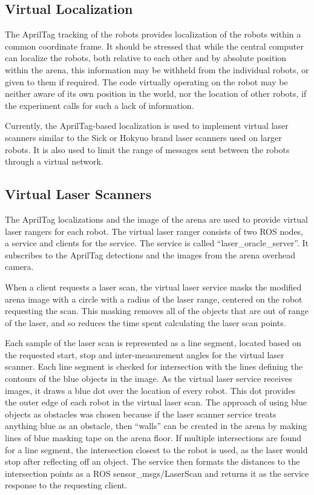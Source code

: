 \subsection{Virtual Localization}

The AprilTag tracking of the robots provides localization of the robots within a common coordinate frame. 
It should be stressed that while the central computer can localize the robots, both relative to each other and by absolute position within the arena, this information may be withheld from the individual robots, or given to them if required. 
The code virtually operating on the robot may be neither aware of its own position in the world, nor the location of other robots, if the experiment calls for such a lack of information. 

Currently, the AprilTag-based localization is used to implement virtual laser scanners similar to the Sick or Hokyuo brand laser scanners used on larger robots. 
It is also used to limit the range of messages sent between the robots through a virtual network. 

\subsection{Virtual Laser Scanners}

The AprilTag localizations and the image of the arena are used to provide virtual laser rangers for each robot. 
The virtual laser ranger consists of two ROS nodes, a service and clients for the service. 
The service is called ``laser\_oracle\_server''. 
It subscribes to the AprilTag detections and the images from the arena overhead camera. 
 
When a client requests a laser scan, the virtual laser service masks the modified arena image with a circle with a radius of the laser range, centered on the robot requesting the scan.
This masking removes all of the objects that are out of range of the laser, and so reduces the time spent calculating the laser scan points. 

Each sample of the laser scan is represented as a line segment, located based on the requested start, stop and inter-measurement angles for the virtual laser scanner. 
Each line segment is checked for intersection with the lines defining the contours of the blue objects in the image. 
As the virtual laser service receives images, it draws a blue dot over the location of every robot. 
This dot provides the outer edge of each robot in the virtual laser scan. 
The approach of using blue objects as obstacles was chosen because if the laser scanner service treats anything blue as an obstacle, then ``walls'' can be created in the arena by making lines of blue masking tape on the arena floor. 
If multiple intersections are found for a line segment, the intersection closest to the robot is used, as the laser would stop after reflecting off an object.
The service then formats the distances to the intersection points as a ROS sensor\_msgs/LaserScan and returns it as the service response to the requesting client. 

